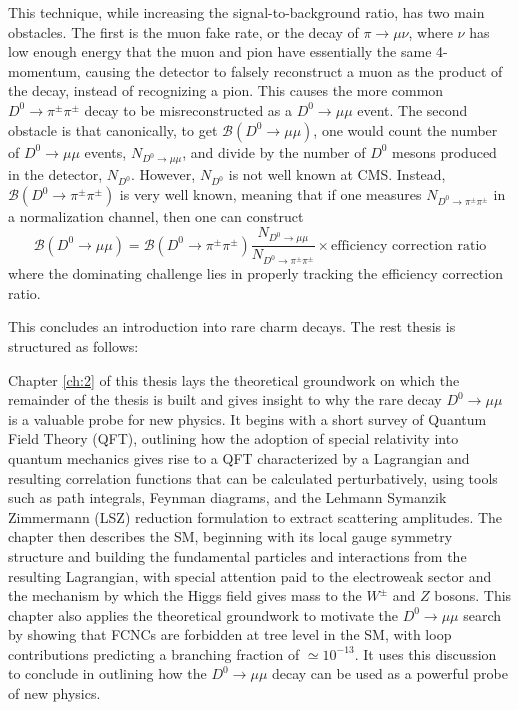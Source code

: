 This technique, while increasing the signal-to-background ratio, has two main obstacles. The first is the muon fake rate, or the decay of $\pi \to \mu \nu$, where $\nu$ has low enough energy that the muon and pion have essentially the same 4-momentum, causing the detector to falsely reconstruct a muon as the product of the decay, instead of recognizing a pion. This causes the more common $D^0 \to \pi^\pm \pi^\pm$ decay to be misreconstructed as a $D^0 \to \mu\mu$ event. The second obstacle is that canonically, to get $\mathcal{B}(D^0 \to \mu\mu)$, one would count the number of $D^0 \to \mu\mu$ events, $N_{D^0 \to \mu\mu}$, and divide by the number of $D^0$ mesons produced in the detector, $N_{D^0}$. However, $N_{D^0}$ is not well known at CMS. Instead, $\mathcal{B}(D^0 \to \pi^\pm \pi^\pm)$ is very well known, meaning that if one measures $N_{D^0 \to \pi^\pm \pi^\pm}$ in a normalization channel, then one can construct
$$
\mathcal{B}(D^0 \to \mu\mu) = \mathcal{B}(D^0 \to \pi^\pm \pi^\pm) \frac{N_{D^0 \to \mu\mu}}{N_{D^0 \to \pi^\pm \pi^\pm}} \times \text{efficiency correction ratio}
$$
where the dominating challenge lies in properly tracking the efficiency correction ratio.

\bigbreak

This concludes an introduction into rare charm decays. The rest thesis is structured as follows:

Chapter \ref{ch:2} of this thesis lays the theoretical groundwork on which the remainder of the thesis is built and gives insight to why the rare decay $D^0 \to \mu\mu$ is a valuable probe for new physics. It begins with a short survey of Quantum Field Theory (QFT), outlining how the adoption of special relativity into quantum mechanics gives rise to a QFT characterized by a Lagrangian and resulting correlation functions that can be calculated perturbatively, using tools such as path integrals, Feynman diagrams, and the Lehmann Symanzik Zimmermann (LSZ) reduction formulation to extract scattering amplitudes. The chapter then describes the SM, beginning with its local gauge symmetry structure and building the fundamental particles and interactions from the resulting Lagrangian, with special attention paid to the electroweak sector and the mechanism by which the Higgs field gives mass to the $W^\pm$ and $Z$ bosons. This chapter also applies the theoretical groundwork to motivate the $D^0 \to \mu\mu$  search by showing that FCNCs are forbidden at tree level in the SM, with loop contributions predicting a branching fraction of $\simeq 10^{-13}$. It uses this discussion to conclude in outlining how the $D^0 \to \mu\mu$ decay can be used as a powerful probe of new physics. 

